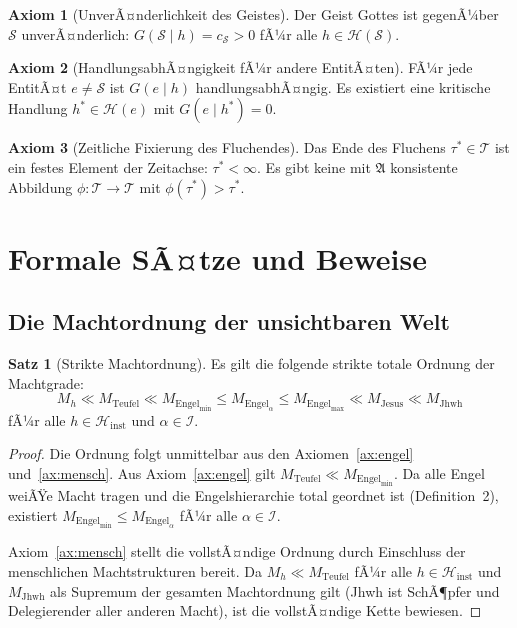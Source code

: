 ﻿\documentclass[a4paper,12pt]{article}
\theoremstyle{definition}
\newtheorem{satz}{Satz}
\newtheorem{axiom}{Axiom}
\begin{document}
\begin{axiom}[UnverÃ¤nderlichkeit des Geistes]
\label{ax:unv}
  Der Geist Gottes ist gegenÃ¼ber $\mathcal{S}$ unverÃ¤nderlich:
  $G(\mathcal{S} \mid h) = c_{\mathcal{S}} > 0$ fÃ¼r alle $h \in \mathcal{H}(\mathcal{S})$.
\end{axiom}

\begin{axiom}[HandlungsabhÃ¤ngigkeit fÃ¼r andere EntitÃ¤ten]
\label{ax:handlung}
  FÃ¼r jede EntitÃ¤t $e \neq \mathcal{S}$ ist $G(e \mid h)$ handlungsabhÃ¤ngig.
  Es existiert eine kritische Handlung $h^* \in \mathcal{H}(e)$ mit $G(e \mid h^*) = 0$.
\end{axiom}

\begin{axiom}[Zeitliche Fixierung des Fluchendes]
\label{ax:endzeit}
  Das Ende des Fluchens $\tau^* \in \mathcal{T}$ ist ein festes Element der
  Zeitachse: $\tau^* < \infty$. Es gibt keine mit $\mathfrak{A}$ konsistente
  Abbildung $\phi: \mathcal{T} \to \mathcal{T}$ mit $\phi(\tau^*) > \tau^*$.
\end{axiom}

\section{Formale SÃ¤tze und Beweise}

\subsection{Die Machtordnung der unsichtbaren Welt}

\begin{satz}[Strikte Machtordnung]
\label{satz:ordnung}
  Es gilt die folgende strikte totale Ordnung der Machtgrade:
  \[
    M_h \ll M_{\mathrm{Teufel}} \ll M_{\mathrm{Engel}_{\min}}
    \leq M_{\mathrm{Engel}_\alpha} \leq M_{\mathrm{Engel}_{\max}}
    \ll M_{\mathrm{Jesus}} \ll M_{\mathrm{Jhwh}}
  \]
  fÃ¼r alle $h \in \mathcal{H}_{\text{inst}}$ und $\alpha \in \mathcal{I}$.
\end{satz}

\begin{proof}
  Die Ordnung folgt unmittelbar aus den Axiomen~\ref{ax:engel} und~\ref{ax:mensch}.
  Aus Axiom~\ref{ax:engel} gilt $M_{\mathrm{Teufel}} \ll M_{\mathrm{Engel}_{\min}}$.
  Da alle Engel weiÃŸe Macht tragen und die Engelshierarchie total geordnet ist
  (Definition~2), existiert $M_{\mathrm{Engel}_{\min}} \leq M_{\mathrm{Engel}_\alpha}$
  fÃ¼r alle $\alpha \in \mathcal{I}$.

  Axiom~\ref{ax:mensch} stellt die vollstÃ¤ndige Ordnung durch Einschluss der
  menschlichen Machtstrukturen bereit. Da $M_h \ll M_{\mathrm{Teufel}}$ fÃ¼r alle
  $h \in \mathcal{H}_{\text{inst}}$ und $M_{\mathrm{Jhwh}}$ als Supremum der
  gesamten Machtordnung gilt (Jhwh ist SchÃ¶pfer und Delegierender aller anderen
  Macht), ist die vollstÃ¤ndige Kette bewiesen.
\end{proof}
\end{document}
